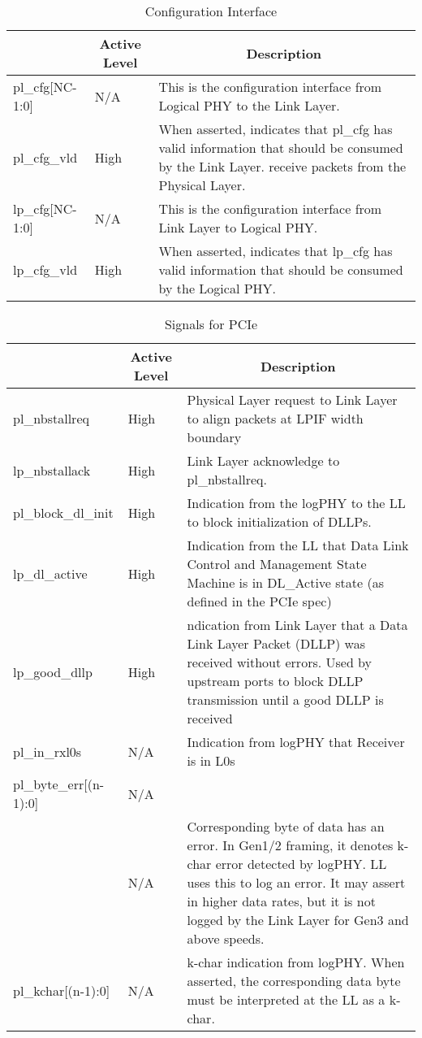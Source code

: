 \begin{table}[H]
    \caption{Configuration Interface}
    \centering
  \begin{tabular}{ |m{26mm}|m{10mm}|m{60mm}|  }
\hline
\rowcolor{Gray}
\multicolumn{1}{|c|}{\textbf{Name} } 
& \multicolumn{1}{|c|}{\textbf{Active Level}} 
& \multicolumn{1}{|c|}{\textbf{Description}}\\
\hline
pl\_cfg[NC-1:0] & N/A & This is the configuration interface from Logical PHY to the Link Layer. \\ \hline
pl\_cfg\_vld & High & When asserted, indicates that pl\_cfg has valid information that should be
consumed by the Link Layer.
receive packets from the Physical Layer. \\ \hline
lp\_cfg[NC-1:0] & N/A & This is the configuration interface from Link Layer to Logical PHY.\\ \hline
lp\_cfg\_vld & High &When asserted, indicates that lp\_cfg has valid information that should be
consumed by the Logical PHY. \\ \hline
\end{tabular}
\end{table}

\begin{table}[H]
    \caption{Signals for PCIe}
    \centering
  \begin{tabular}{ |m{26mm}|m{10mm}|m{60mm}|  }
\hline
\rowcolor{Gray}
\multicolumn{1}{|c|}{\textbf{Name} } 
& \multicolumn{1}{|c|}{\textbf{Active Level}} 
& \multicolumn{1}{|c|}{\textbf{Description}}\\
\hline
pl\_nbstallreq& High &Physical Layer request to Link Layer to align packets at LPIF width boundary \\ \hline 
lp\_nbstallack& High & Link Layer acknowledge to pl\_nbstallreq.\\ \hline 

pl\_block\_dl\_init &High & Indication from the logPHY to the LL to block initialization of DLLPs.\\ \hline 
lp\_dl\_active &High & Indication from the LL that Data Link Control and Management State Machine is in
DL\_Active state (as defined in the PCIe spec)\\ \hline 
lp\_good\_dllp &High & ndication from Link Layer that a Data Link Layer Packet (DLLP) was received without errors. Used by upstream ports to block DLLP transmission until a good DLLP is received\\ \hline 
pl\_in\_rxl0s & N/A& Indication from logPHY that Receiver is in L0s\\ \hline 
pl\_byte\_err[(n-1):0] &N/A & \\ \hline 
&N/A & Corresponding byte of data has an error. In Gen1/2 framing, it denotes k-char error detected by logPHY. LL uses this to log an error. It may assert in higher data rates, but it
is not logged by the Link Layer for Gen3 and above speeds.
\\ \hline 
pl\_kchar[(n-1):0] &N/A & k-char indication from logPHY. When asserted, the corresponding data byte must be
interpreted at the LL as a k-char.\\ \hline 

\end{tabular}
\end{table}


